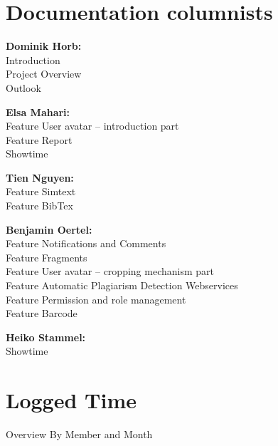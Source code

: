 \begin{appendix}

\chapter{Documentation columnists}

\textbf{Dominik Horb:}\\
  Introduction\\
  Project Overview  \\
  Outlook

\textbf{Elsa Mahari:}\\
  Feature User avatar – introduction part\\
  Feature Report\\
  Showtime

\textbf{Tien Nguyen:}\\
  Feature Simtext\\
  Feature BibTex

\textbf{Benjamin Oertel:}\\
  Feature Notifications and Comments\\
  Feature Fragments\\
  Feature User avatar – cropping mechanism part \\
  Feature Automatic Plagiarism Detection Webservices \\
  Feature Permission and role management \\
  Feature Barcode

\textbf{Heiko Stammel:}\\
  Showtime \\


\chapter{Logged Time}


\begin{table}[htbp]
  \caption{Overview By Member and Month}
  \centering
\end{table}








\end{appendix}
